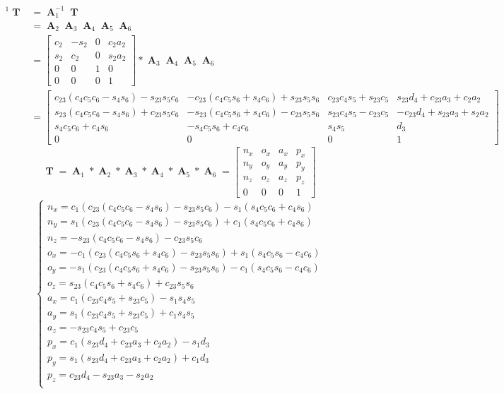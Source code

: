 \documentclass[12pt]{article}
\DeclareMathOperator{\A}{\mathbf{A}}
\DeclareMathOperator{\T}{\mathbf{T}}
\begin{document}
  \begin{align*}
  ^{1}\T & = \A_1^{-1}\T\\
    & = \A_2\A_3\A_4\A_5\A_6\\
    & =
    \begin{bmatrix}
      c_2 & -s_2 & 0 & c_2a_2\\
      s_2 & c_2 & 0 & s_2a_2\\
      0 & 0 & 1 & 0\\
      0 & 0 & 0 & 1
    \end{bmatrix} * \A_3\A_4\A_5\A_6\\
    & =
    \begin{bmatrix}
      c_{23}(c_4c_5c_6-s_4s_6)-s_{23}s_5c_6 & -c_{23}(c_4c_5s_6+s_4c_6)+s_{23}s_5s_6 & c_{23}c_4s_5+s_{23}c_5 & s_{23}d_4+c_{23}a_3+c_2a_2\\
      s_{23}(c_4c_5c_6-s_4s_6)+c_{23}s_5c_6 & -s_{23}(c_4c_5s_6+s_4c_6)-c_{23}s_5s_6 & s_{23}c_4s_5-c_{23}c_5 & -c_{23}d_4+s_{23}a_3+s_2a_2\\
      s_4c_5c_6+c_4s_6 & -s_4c_5s_6+c_4c_6 & s_4s_5 & d_3\\
      0 & 0 & 0 & 1
    \end{bmatrix}
  \end{align*}
  $$\T = \A_1 * \A_2 * \A_3 * \A_4 * \A_5 * \A_6 = 
  \begin{bmatrix}
    n_x & o_x & a_x & p_x\\
    n_y & o_y & a_y & p_y\\
    n_z & o_z & a_z & p_z\\
    0 & 0 & 0 & 1
  \end{bmatrix}$$
  \begin{align*}
    \begin{cases}
      n_x = c_1(c_{23}(c_4c_5c_6-s_4s_6)-s_{23}s_5c_6)-s_1(s_4c_5c_6+c_4s_6)\\
      n_y = s_1(c_{23}(c_4c_5c_6-s_4s_6)-s_{23}s_5c_6)+c_1(s_4c_5c_6+c_4s_6)\\
      n_z = -s_{23}(c_4c_5c_6-s_4s_6)-c_{23}s_5c_6\\
      o_x = -c_1(c_{23}(c_4c_5s_6+s_4c_6)-s_{23}s_5s_6)+s_1(s_4c_5s_6-c_4c_6)\\
      o_y = -s_1(c_{23}(c_4c_5s_6+s_4c_6)-s_{23}s_5s_6)-c_1(s_4c_5s_6-c_4c_6)\\
      o_z = s_{23}(c_4c_5s_6+s_4c_6)+c_{23}s_5s_6\\
      a_x = c_1(c_{23}c_4s_5+s_{23}c_5)-s_1s_4s_5\\
      a_y = s_1(c_{23}c_4s_5+s_{23}c_5)+c_1s_4s_5\\
      a_z = -s_{23}c_4s_5+c_{23}c_5\\
      p_x = c_1(s_{23}d_4+c_{23}a_3+c_2a_2)-s_1d_3\\
      p_y = s_1(s_{23}d_4+c_{23}a_3+c_2a_2)+c_1d_3\\
      p_z = c_{23}d_4-s_{23}a_3-s_2a_2\\
    \end{cases}
  \end{align*}
\end{document}
